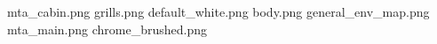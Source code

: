 mta_cabin.png
grills.png
default_white.png
body.png
general_env_map.png
mta_main.png
chrome_brushed.png
